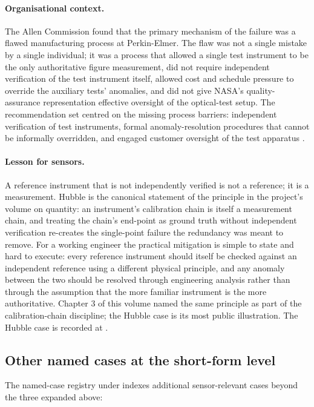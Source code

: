 \paragraph{Organisational context.} The Allen Commission found that
the primary mechanism of the failure was a flawed manufacturing
process at Perkin-Elmer. The flaw was not a single mistake by a
single individual; it was a process that allowed a single test
instrument to be the only authoritative figure measurement, did
not require independent verification of the test instrument
itself, allowed cost and schedule pressure to override the
auxiliary tests' anomalies, and did not give NASA's
quality-assurance representation effective oversight of the
optical-test setup. The recommendation set centred on the missing
process barriers: independent verification of test instruments,
formal anomaly-resolution procedures that cannot be informally
overridden, and engaged customer oversight of the test apparatus
\cite{acc:nasa-hubble-optical-systems-1990}.

\paragraph{Lesson for sensors.} A reference instrument that is not
independently verified is not a reference; it is a measurement.
Hubble is the canonical statement of the principle in the project's
volume on quantity: an instrument's calibration chain is itself a
measurement chain, and treating the chain's end-point as ground
truth without independent verification re-creates the single-point
failure the redundancy was meant to remove. For a working engineer
the practical mitigation is simple to state and hard to execute:
every reference instrument should itself be checked against an
independent reference using a different physical principle, and
any anomaly between the two should be resolved through engineering
analysis rather than through the assumption that the more familiar
instrument is the more authoritative. Chapter 3 of this volume
named the same principle as part of the calibration-chain
discipline; the Hubble case is its most public illustration. The
Hubble case is recorded at
.

\subsection{Other named cases at the short-form level}

The named-case registry under 
indexes additional sensor-relevant cases beyond the three expanded
above:

